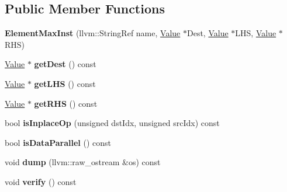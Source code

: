 \subsection*{Public Member Functions}
\begin{DoxyCompactItemize}
\item 
\mbox{\label{classglow_1_1_element_max_inst_ab65220480f59b4cbf4e43a8db255b151}} 
{\bfseries Element\+Max\+Inst} (llvm\+::\+String\+Ref name, \hyperlink{classglow_1_1_value}{Value} $\ast$Dest, \hyperlink{classglow_1_1_value}{Value} $\ast$L\+HS, \hyperlink{classglow_1_1_value}{Value} $\ast$R\+HS)
\item 
\mbox{\label{classglow_1_1_element_max_inst_a0f7d74d87ddfd78adc03b0e4e9267f3f}} 
\hyperlink{classglow_1_1_value}{Value} $\ast$ {\bfseries get\+Dest} () const
\item 
\mbox{\label{classglow_1_1_element_max_inst_a08870305f5228031b3713e1fcccbcca1}} 
\hyperlink{classglow_1_1_value}{Value} $\ast$ {\bfseries get\+L\+HS} () const
\item 
\mbox{\label{classglow_1_1_element_max_inst_a2af40f8bbc3f082856b5e154c504cb9f}} 
\hyperlink{classglow_1_1_value}{Value} $\ast$ {\bfseries get\+R\+HS} () const
\item 
\mbox{\label{classglow_1_1_element_max_inst_a2415493b5f3893a55c0107370b575622}} 
bool {\bfseries is\+Inplace\+Op} (unsigned dst\+Idx, unsigned src\+Idx) const
\item 
\mbox{\label{classglow_1_1_element_max_inst_a2dee39e48a468e06bf100fe1a5af45bf}} 
bool {\bfseries is\+Data\+Parallel} () const
\item 
\mbox{\label{classglow_1_1_element_max_inst_a1f1c1c55c617eea3a6ef9ad4471cbb2a}} 
void {\bfseries dump} (llvm\+::raw\+\_\+ostream \&os) const
\item 
\mbox{\label{classglow_1_1_element_max_inst_a179183391d5f0f550d899434ec1338ae}} 
void {\bfseries verify} () const
\end{DoxyCompactItemize}
